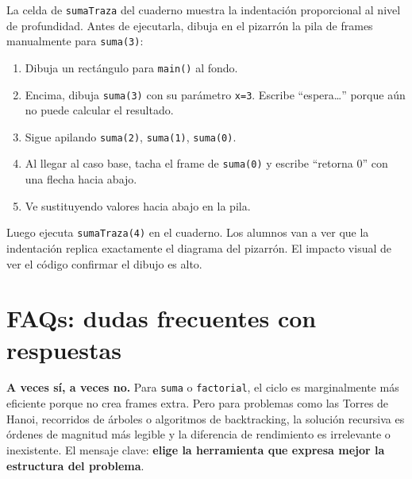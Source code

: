 \documentclass[12pt, oneside]{article}
\begin{document}
\begin{notaprofesor}
  La celda de \texttt{sumaTraza} del cuaderno muestra la indentación
  proporcional al nivel de profundidad.  Antes de ejecutarla, dibuja en
  el pizarrón la pila de frames manualmente para \texttt{suma(3)}:

  \begin{enumerate}
    \item Dibuja un rectángulo para \texttt{main()} al fondo.
    \item Encima, dibuja \texttt{suma(3)} con su parámetro \texttt{x=3}.
          Escribe ``espera\ldots'' porque aún no puede calcular el resultado.
    \item Sigue apilando \texttt{suma(2)}, \texttt{suma(1)}, \texttt{suma(0)}.
    \item Al llegar al caso base, tacha el frame de \texttt{suma(0)} y escribe
          ``retorna 0'' con una flecha hacia abajo.
    \item Ve sustituyendo valores hacia abajo en la pila.
  \end{enumerate}

  Luego ejecuta \texttt{sumaTraza(4)} en el cuaderno.  Los alumnos van a
  ver que la indentación replica exactamente el diagrama del pizarrón.
  El impacto visual de ver el código confirmar el dibujo es alto.
\end{notaprofesor}

\section{FAQs: dudas frecuentes con respuestas}

\begin{notaprofesor}
  \textbf{A veces sí, a veces no.}  Para \texttt{suma} o \texttt{factorial},
  el ciclo es marginalmente más eficiente porque no crea frames extra.
  Pero para problemas como las Torres de Hanoi, recorridos de árboles o
  algoritmos de backtracking, la solución recursiva es órdenes de magnitud
  más legible y la diferencia de rendimiento es irrelevante o inexistente.
  El mensaje clave: \textbf{elige la herramienta que expresa mejor
  la estructura del problema}.
\end{notaprofesor}
\end{document}
